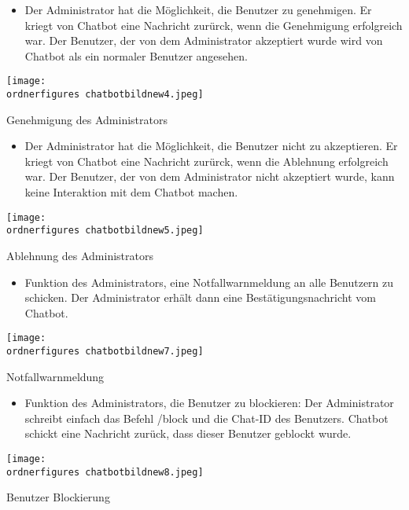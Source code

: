 \begin{itemize}
	\item Der Administrator hat die M\"oglichkeit, die Benutzer zu genehmigen. Er kriegt von Chatbot eine Nachricht zur\"urck, wenn die Genehmigung erfolgreich war. Der Benutzer, der von dem Administrator akzeptiert wurde wird von Chatbot als ein normaler Benutzer angesehen.
\end{itemize}
\begin{center}
	\captionsetup{type=figure}
	\texttt{[image: \\ordnerfigures chatbotbildnew4.jpeg]}
	\caption{Genehmigung des Administrators}
	\label{chatbotbenjdf}
\end{center}
\begin{itemize}
	\item Der Administrator hat die M\"oglichkeit, die Benutzer nicht zu akzeptieren. Er kriegt von Chatbot eine Nachricht zur\"urck, wenn die Ablehnung erfolgreich war. Der Benutzer, der von dem Administrator nicht akzeptiert wurde, kann keine Interaktion mit dem Chatbot machen.
\end{itemize}
\begin{center}
	\captionsetup{type=figure}
	\texttt{[image: \\ordnerfigures chatbotbildnew5.jpeg]}
	\caption{Ablehnung des Administrators}
	\label{chatbotbenjjdf}
\end{center}
\begin{itemize}
	\item Funktion des Administrators, eine Notfallwarnmeldung an alle Benutzern zu schicken. Der Administrator erhält dann eine Bestätigungsnachricht vom Chatbot.
\end{itemize}
\begin{center}
	\captionsetup{type=figure}
	\texttt{[image: \\ordnerfigures chatbotbildnew7.jpeg]}
	\caption{Notfallwarnmeldung}
	\label{chatbfotbenjjdf}
\end{center}
\begin{itemize}
	\item Funktion des Administrators, die Benutzer zu blockieren: Der Administrator schreibt einfach das Befehl /block und die Chat-ID des Benutzers. Chatbot schickt eine Nachricht zurück, dass dieser Benutzer geblockt wurde.
\end{itemize}
\begin{center}
	\captionsetup{type=figure}
	\texttt{[image: \\ordnerfigures chatbotbildnew8.jpeg]}
	\caption{Benutzer Blockierung}
	\label{fig:chatbotblock} 
	\captionsetup{type=figure} 
\end{center}
